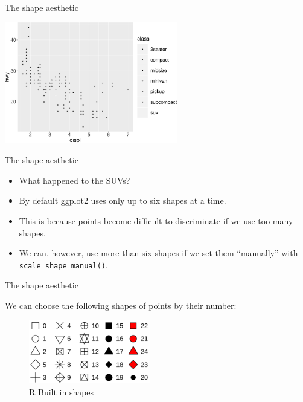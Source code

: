 \documentclass[ignorenonframetext,]{beamer}
\begin{document}
\begin{frame}{The shape aesthetic}
\protect\hypertarget{the-shape-aesthetic-1}{}

\begin{center}\includegraphics[height=200px]{data-visualization_files/figure-beamer/unnamed-chunk-16-1} \end{center}

\end{frame}

\begin{frame}[fragile]{The shape aesthetic}
\protect\hypertarget{the-shape-aesthetic-2}{}

\begin{itemize}
\item
  What happened to the SUVs?
\item
  By default ggplot2 uses only up to six shapes at a time.
\item
  This is because points become difficult to discriminate if we use too
  many shapes.
\item
  We can, however, use more than six shapes if we set them ``manually''
  with \texttt{scale\_shape\_manual()}.
\end{itemize}

\end{frame}

\begin{frame}{The shape aesthetic}
\protect\hypertarget{the-shape-aesthetic-3}{}

We can choose the following shapes of points by their number:

\begin{figure}
\centering
\includegraphics[width=2.08333in,height=\textheight]{shapes-1}
\caption{R Built in shapes}
\end{figure}

\end{frame}
\end{document}
